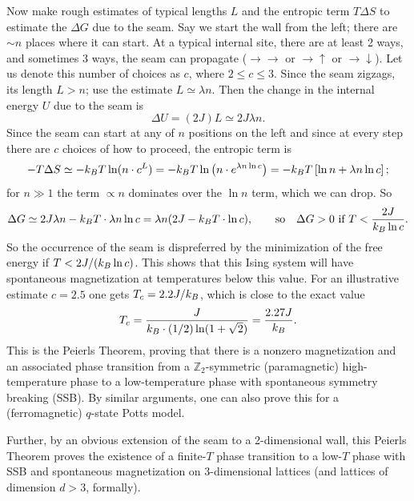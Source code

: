 Now make rough estimates of typical lengths $L$ and the entropic term $T\Delta S$ to estimate the
$\Delta G$ due to the seam. Say we start the wall from the left; there are $\sim n$ places where it
can start. At a typical internal site, there are at least 2 ways, and sometimes 3 ways, the seam
can propagate ($\rightarrow\rightarrow$ or $\rightarrow\uparrow$ or $\rightarrow\downarrow$). Let us
denote this number of choices as $c$, where $2\le c\le 3$. Since the seam zigzags, its length
$L>n$; use the estimate $L\simeq\lambda n$. Then the change in the internal energy $U$ due to the
seam is
\begin{equation}
  \Delta U = (2J)L\simeq 2J\lambda n .
\end{equation}
Since the seam can start at any of $n$ positions on the left and since at every step there are $c$
choices of how to proceed, the entropic term is
\begin{equation}
  -T\Delta S\simeq -k_{B} T\ln(n\cdot c^L) = -k_{B} T\ln\left(n\cdot e^{\lambda n\ln c}\right)
  = -k_{B} T\left[\ln n + \lambda n\ln c\right];
\end{equation}
for $n\gg 1$ the term $\propto n$ dominates over the $\ln n$ term, which we can drop. So
\begin{equation}
  \Delta G\simeq 2J\lambda n - k_{B} T\cdot\lambda n\ln c = \lambda n(2J - k_{B} T\cdot\ln c),
  \qquad\text{so}\quad \Delta G>0\ \text{if}\ T<\frac{2J}{k_{B}\ln c}.
\end{equation}
So the occurrence of the seam is dispreferred by the minimization of the free energy if
$T<2J/(k_{B}\ln c)$. This shows that this Ising system will have spontaneous magnetization at
temperatures below this value. For an illustrative estimate $c = 2.5$ one gets $T_c = 2.2J/k_{B}$,
which is close to the exact value
\begin{equation}
  T_c = \frac{J}{k_{B}\cdot(1/2)\ln(1+\sqrt2)} = \frac{2.27J}{k_{B}}.
\end{equation}
This is the Peierls Theorem, proving that there is a nonzero magnetization and an associated phase
transition from a $\mathbb{Z}_2$-symmetric (paramagnetic) high-temperature phase to a
low-temperature phase with spontaneous symmetry breaking (SSB). By similar arguments, one can also
prove this for a (ferromagnetic) $q$-state Potts model.

Further, by an obvious extension of the seam to a 2-dimensional wall, this Peierls Theorem proves the
existence of a finite-$T$ phase transition to a low-$T$ phase with SSB and spontaneous magnetization
on 3-dimensional lattices (and lattices of dimension $d>3$, formally).

